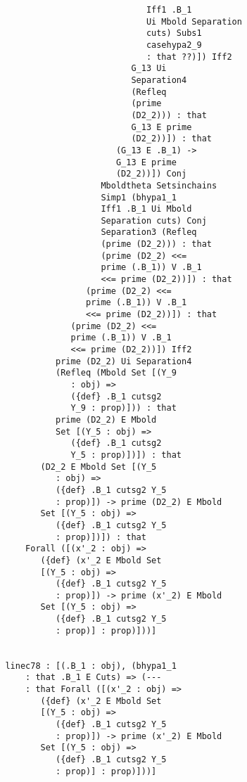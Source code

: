 \documentclass[12pt]{article}
\begin{document}
\begin{verbatim}
                                     Iff1 .B_1 
                                     Ui Mbold Separation 
                                     cuts) Subs1 
                                     casehypa2_9 
                                     : that ??)]) Iff2 
                                  G_13 Ui 
                                  Separation4 
                                  (Refleq 
                                  (prime 
                                  (D2_2))) : that 
                                  G_13 E prime 
                                  (D2_2))]) : that 
                               (G_13 E .B_1) -> 
                               G_13 E prime 
                               (D2_2))]) Conj 
                            Mboldtheta Setsinchains 
                            Simp1 (bhypa1_1 
                            Iff1 .B_1 Ui Mbold 
                            Separation cuts) Conj 
                            Separation3 (Refleq 
                            (prime (D2_2))) : that 
                            (prime (D2_2) <<= 
                            prime (.B_1)) V .B_1 
                            <<= prime (D2_2))]) : that 
                         (prime (D2_2) <<= 
                         prime (.B_1)) V .B_1 
                         <<= prime (D2_2))]) : that 
                      (prime (D2_2) <<= 
                      prime (.B_1)) V .B_1 
                      <<= prime (D2_2))]) Iff2 
                   prime (D2_2) Ui Separation4 
                   (Refleq (Mbold Set [(Y_9 
                      : obj) => 
                      ({def} .B_1 cutsg2 
                      Y_9 : prop)])) : that 
                   prime (D2_2) E Mbold 
                   Set [(Y_5 : obj) => 
                      ({def} .B_1 cutsg2 
                      Y_5 : prop)])]) : that 
                (D2_2 E Mbold Set [(Y_5 
                   : obj) => 
                   ({def} .B_1 cutsg2 Y_5 
                   : prop)]) -> prime (D2_2) E Mbold 
                Set [(Y_5 : obj) => 
                   ({def} .B_1 cutsg2 Y_5 
                   : prop)])]) : that 
             Forall ([(x'_2 : obj) => 
                ({def} (x'_2 E Mbold Set 
                [(Y_5 : obj) => 
                   ({def} .B_1 cutsg2 Y_5 
                   : prop)]) -> prime (x'_2) E Mbold 
                Set [(Y_5 : obj) => 
                   ({def} .B_1 cutsg2 Y_5 
                   : prop)] : prop)]))]


         linec78 : [(.B_1 : obj), (bhypa1_1 
             : that .B_1 E Cuts) => (--- 
             : that Forall ([(x'_2 : obj) => 
                ({def} (x'_2 E Mbold Set 
                [(Y_5 : obj) => 
                   ({def} .B_1 cutsg2 Y_5 
                   : prop)]) -> prime (x'_2) E Mbold 
                Set [(Y_5 : obj) => 
                   ({def} .B_1 cutsg2 Y_5 
                   : prop)] : prop)]))]



\end{verbatim}
\end{document}
